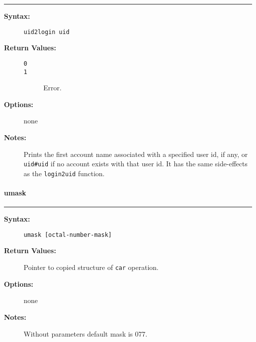 \hrule
\begin{description}
\item[{\bf Syntax:}] \mbox{}

{\tt uid2login uid}

\item[{\bf Return Values:}] \mbox{}

\begin{description}
\item[{\tt 0}] \mbox{}



\item[{\tt 1}] \mbox{}

Error.

\end{description}


\item[{\bf Options:}] \mbox{}

none  

\item[{\bf Notes:}] \mbox{}

Prints the first account name associated with 
a specified user id, if any, or {\tt uid\#uid} if no account 
exists with that user id. It has the same side-effects as the 
{\tt login2uid} function. 

\end{description}


\vspace {2pt}


\paragraph{umask}

\hrule
\begin{description}
\item[{\bf Syntax:}] \mbox{}

{\tt umask [octal-number-mask]}

\item[{\bf Return Values:}] \mbox{}

Pointer to copied structure of {\tt car} 
operation.

\item[{\bf Options:}] \mbox{}

none  

\item[{\bf Notes:}] \mbox{}

Without parameters default mask is 077.

\end{description}


